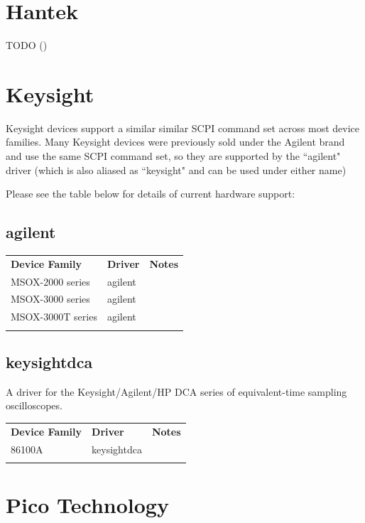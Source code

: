 \section{Hantek}
TODO ()

\section{Keysight}

Keysight devices support a similar similar SCPI command set across most device families. Many Keysight devices were
previously sold under the Agilent brand and use the same SCPI command set, so they are supported by the ``agilent"
driver (which is also aliased as ``keysight" and can be used under either name)

Please see the table below for details of current hardware support:

\subsection{agilent}

\begin{tabularx}{16cm}{llX}
\thickhline
\textbf{Device Family} & \textbf{Driver} & \textbf{Notes} \\
\thickhline
MSOX-2000 series & agilent &  \\
\thinhline
MSOX-3000 series & agilent &  \\
\thinhline
MSOX-3000T series & agilent &  \\
\thickhline
\end{tabularx}

\subsection{keysightdca}

A driver for the Keysight/Agilent/HP DCA series of equivalent-time sampling oscilloscopes.

\begin{tabularx}{16cm}{llX}
\thickhline
\textbf{Device Family} & \textbf{Driver} & \textbf{Notes} \\
\thickhline
86100A & keysightdca &  \\
\thickhline
\end{tabularx}

\section{Pico Technology}


